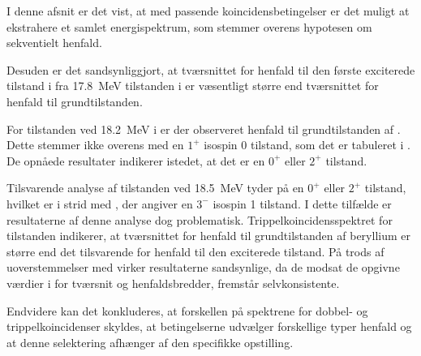 I denne afsnit er det vist, at med passende koincidensbetingelser er det muligt at ekstrahere et
samlet energispektrum, som stemmer overens hypotesen om sekventielt henfald.

Desuden er det sandsynliggjort, at tværsnittet for henfald til den første exciterede tilstand i \Be
fra \SI{17.8}{\MeV} tilstanden i \Carb er væsentligt større end tværsnittet for henfald til
grundtilstanden.

For tilstanden ved \SI{18.2}{\MeV} i \Carb er der observeret henfald til grundtilstanden af
\Be. Dette stemmer ikke overens med en $1^{+}$ isospin 0 tilstand, som det er tabuleret i
\cite{States}. De opnåede resultater indikerer istedet, at det er en $0^{+}$ eller $2^{+}$ tilstand.

Tilsvarende analyse af tilstanden ved \SI{18.5}{\MeV} tyder på en $0^{+}$ eller $2^{+}$ tilstand,
hvilket er i strid med \cite{States}, der angiver en $3^{-}$ isospin 1 tilstand. I dette tilfælde er
resultaterne af denne analyse dog problematisk. Trippelkoincidensspektret for tilstanden indikerer,
at tværsnittet for henfald til grundtilstanden af beryllium er større end det tilsvarende for
henfald til den exciterede tilstand. På trods af uoverstemmelser med \cite{States} virker
resultaterne sandsynlige, da de modsat de opgivne værdier i \cite{States} for tværsnit og
henfaldsbredder, fremstår selvkonsistente.
%

Endvidere kan det konkluderes, at forskellen på spektrene for dobbel- og trippelkoincidenser
skyldes, at betingelserne udvælger forskellige typer henfald og at denne selektering afhænger af den
specifikke opstilling.
